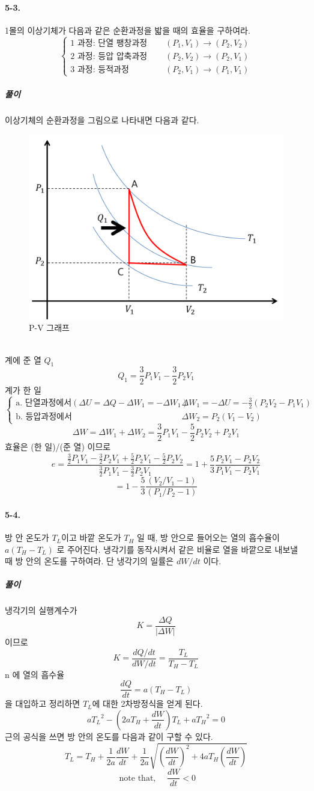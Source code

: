\documentclass[a4paper,12pt]{report}
\begin{document}
	\paragraph{5-3. } 1몰의 이상기체가 다음과 같은 순환과정을 밟을 때의 효율을 구하여라.
	$$\begin{cases}
	\mbox{1 과정: 단열 팽창과정 }&\quad (P_1,V_1)\rightarrow(P_2,V_2)\\
	\mbox{2 과정: 등압 압축과정 }&\quad (P_2,V_2)\rightarrow(P_2,V_1)\\
	\mbox{3 과정: 등적과정 }&\quad (P_2,V_1)\rightarrow(P_1,V_1)
	\end{cases}$$
	\subparagraph{풀이} 이상기체의 순환과정을 그림으로 나타내면 다음과 같다. 
	\begin{figure}[h]
		\centering
		\includegraphics[width=0.5\columnwidth]{fig1.png}
		\caption{P-V 그래프}
	\end{figure}\\
	계에 준 열 $Q_1$
	$$Q_1=\frac{3}{2}P_1V_1-\frac{3}{2}P_2V_1$$
	계가 한 일
	$$\begin{cases}
	\mbox{a. 단열과정에서} (\Delta U=\Delta Q-\Delta W_1=-\Delta W_1) & \Delta W_1=-\Delta U=-\frac{3}{2}(P_2V_2-P_1V_1)\\
	\mbox{b. 등압과정에서}  & \Delta W_2=P_2(V_1-V_2)
	\end{cases}$$
	$$\Delta W=\Delta W_1+\Delta W_2=\frac{3}{2}P_1V_1-\frac{5}{2}P_2V_2+P_2V_1$$
	효율은 (한 일)/(준 열) 이므로
	$$e=\frac{\frac{3}{2}P_1V_1-\frac{3}{2}P_2V_1+\frac{5}{2}P_2V_1-\frac{5}{2}P_2V_2}{\frac{3}{2}P_1V_1-\frac{3}{2}P_2V_1}=1+\frac{5}{3}\frac{P_2V_1-P_2V_2}{P_1V_1-P_2V_1}$$
	$$=1-\frac{5}{3}\frac{(V_2/V_1-1)}{(P_1/P_2-1)}$$
	\paragraph{5-4. } 방 안 온도가 $T_L$이고 바깥 온도가 $T_H$ 일 때, 방 안으로 들어오는 열의 흡수율이 $a(T_H-T_L)$ 로 주어진다. 냉각기를 동작시켜서 같은 비율로 열을 바깥으로 내보낼 때 방 안의 온도를 구하여라. 단 냉각기의 일률은 $dW/dt$ 이다.
	\subparagraph{풀이} 냉각기의 실행계수가 
	$$K=\frac{\Delta Q}{\left|\Delta W\right|}   $$ 이므로 
	$$K=\frac{dQ/dt}{dW/dt}=\frac{T_L}{T_H-T_L}   $$n 에 열의 흡수율
	$$\frac{dQ}{dt}=a(T_H-T_L)$$ 을 대입하고 정리하면 $T_L$에 대한 2차방정식을 얻게 된다. 
	$$ a{T_L}^2-\left(2aT_H+\frac{dW}{dt} \right)T_L+a{T_H}^2=0 $$
	근의 공식을 쓰면 방 안의 온도를 다음과 같이 구할 수 있다. 
	$$T_L=T_H+\frac{1}{2a}\frac{dW}{dt}+\frac{1}{2a}\sqrt{\left( \frac{dW}{dt}\right) ^2+4aT_H\left(\frac{dW}{dt} \right) }$$
	$$\mbox{ note that, }\quad \frac{dW}{dt}<0$$
\end{document}
